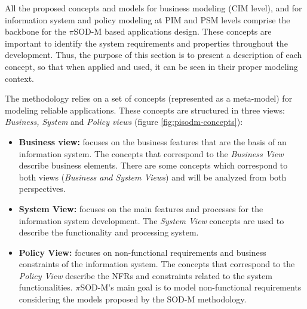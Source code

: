  All the proposed concepts and models for business modeling (CIM
 level), and for information system and policy modeling at PIM and PSM
 levels comprise the backbone for the $\pi$SOD-M based applications design.
 These concepts are important to identify the system requirements and properties throughout the
 development. Thus, the purpose of this section is to present a description of
 each concept, so that when applied and used, it can be seen in their
 proper modeling context. 
 


The methodology relies on a
set of concepts (represented as a meta-model) for modeling
reliable applications. These concepts are structured in three views:
\textit{Business, System} and \textit{Policy views} (figure
\ref{fig:pisodm-concepts}):

\begin{itemize}
  \item \textbf{Business view:} focuses on the business features
  that are the basis of an information system.  The concepts that
correspond to the \textit{Business View} describe business elements. There are
some concepts which correspond to both views (\textit{Business and System
Views}) and will be analyzed from both perspectives. 

  \item \textbf{System View:} focuses on the main features and
  processes for the information system development. The \textit{System View}
  concepts are used to describe the functionality and processing system. 

	\item \textbf{Policy View:} focuses on non-functional requirements and
	business constraints of the information system. The concepts that correspond to
	the \textit{Policy View} describe the NFRs and constraints related to the
	system functionalities. $\pi$SOD-M's main goal is to model non-functional
	requirements considering the models proposed by the SOD-M methodology.
\end{itemize}



